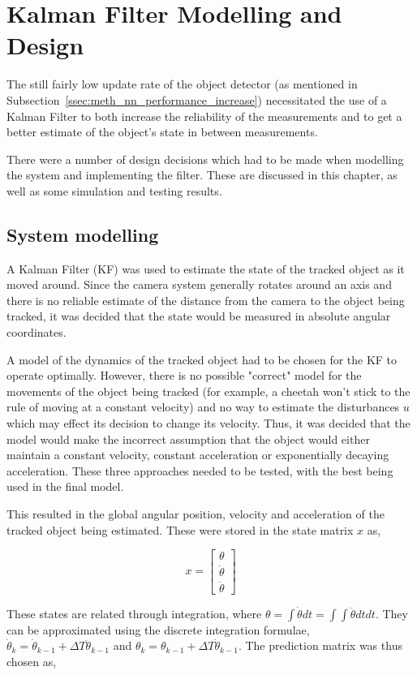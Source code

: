 \chapter{Kalman Filter Modelling and Design}

The still fairly low update rate of the object detector (as mentioned in Subsection~\ref{ssec:meth_nn_performance_increase}) necessitated the use of a Kalman Filter to both increase the reliability of the measurements and to get a better estimate of the object's state in between measurements.

There were a number of design decisions which had to be made when modelling the system and implementing the filter. These are discussed in this chapter, as well as some simulation and testing results.


\section{System modelling}
A Kalman Filter (KF) was used to estimate the state of the tracked object as it moved around. Since the camera system generally rotates around an axis and there is no reliable estimate of the distance from the camera to the object being tracked, it was decided that the state would be measured in absolute angular coordinates.

A model of the dynamics of the tracked object had to be chosen for the KF to operate optimally. However, there is no possible "correct" model for the movements of the object being tracked (for example, a cheetah won't stick to the rule of moving at a constant velocity) and no way to estimate the disturbances $u$ which may effect its decision to change its velocity. Thus, it was decided that the model would make the incorrect assumption that the object would either maintain a constant velocity, constant acceleration or exponentially decaying acceleration. These three approaches needed to be tested, with the best being used in the final model.

This resulted in the global angular position, velocity and acceleration of the tracked object being estimated. These were stored in the state matrix $x$ as,

\[ x = \begin{bmatrix} \theta \\ \dot{\theta} \\ \ddot{\theta} \end{bmatrix} \]

These states are related through integration, where $\theta = \int{\dot{\theta} dt} = \int{\int{\ddot{\theta} dt}dt}$. They can be approximated using the discrete integration formulae, $\dot{\theta}_k = \dot{\theta}_{k-1} + \Delta T \ddot{\theta}_{k-1}$ and $\theta_k = \theta_{k-1} + \Delta T \dot{\theta}_{k-1}$. The prediction matrix was thus chosen as,

